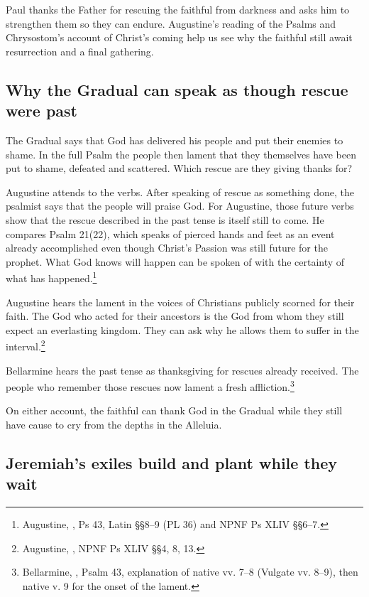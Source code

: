 
Paul thanks the Father for rescuing the faithful from darkness and asks
him to strengthen them so they can endure. Augustine's reading of the
Psalms and Chrysostom's account of Christ's coming help us see why the
faithful still await resurrection and a final gathering.

\subsection{Why the Gradual can speak as though rescue were past}

The Gradual says that God has delivered his people and put their enemies
to shame. In the full Psalm the people then lament that they themselves
have been put to shame, defeated and scattered. Which rescue are they
giving thanks for?

Augustine attends to the verbs. After speaking of rescue as something
done, the psalmist says that the people will praise God. For Augustine,
those future verbs show that the rescue described in the past tense is
itself still to come. He compares Psalm 21(22), which speaks of pierced
hands and feet as an event already accomplished even though Christ's
Passion was still future for the prophet. What God knows will happen
can be spoken of with the certainty of what has
happened.\footnote{Augustine, ,
Ps 43, Latin §§8--9 (PL 36) and NPNF Ps XLIV §§6--7.}

Augustine hears the lament in the voices of Christians publicly scorned
for their faith. The God who acted for their ancestors is the God from
whom they still expect an everlasting kingdom. They can ask why he
allows them to suffer in the interval.\footnote{Augustine,
, NPNF Ps XLIV §§4, 8, 13.}

Bellarmine hears the past tense as thanksgiving for rescues already
received. The people who remember those rescues now lament a fresh
affliction.\footnote{Bellarmine,
, Psalm 43, explanation of
native vv. 7--8 (Vulgate vv. 8--9), then native v. 9 for the onset
of the lament.}

On either account, the faithful can thank God in the Gradual while
they still have cause to cry from the depths in the Alleluia.

\subsection{Jeremiah's exiles build and plant while they wait}

